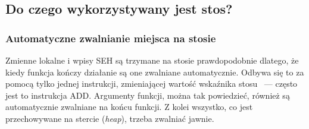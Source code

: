 \subsection{Do czego wykorzystywany jest stos?}








\subsubsection{Automatyczne zwalnianie miejsca na stosie}
Zmienne lokalne i wpisy SEH są trzymane na stosie prawdopodobnie dlatego, że kiedy funkcja kończy działanie są one zwalniane automatycznie. Odbywa się to za pomocą tylko jednej instrukcji, zmieniającej wartość wskaźnika stosu ~--- często jest to  instrukcja ADD.
Argumenty funkcji, można tak powiedzieć, również są automatycznie zwalniane na końcu funkcji.
Z kolei wszystko, co jest przechowywane na stercie (\emph{heap}), trzeba zwalniać jawnie.





